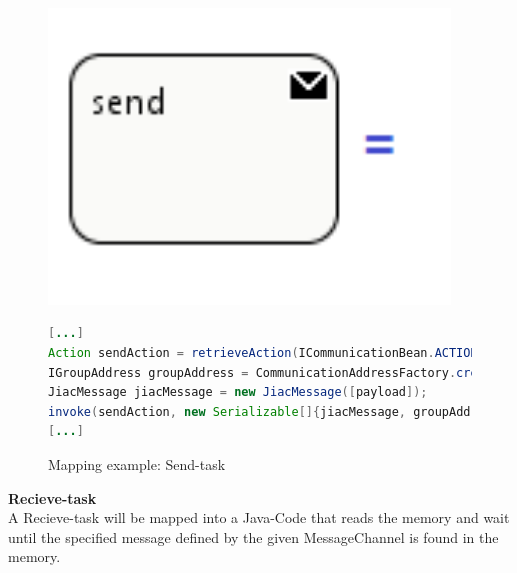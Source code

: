 \begin{figure}[h]
\begin{minipage}[c]{0.3\textwidth}
\includegraphics[width=0.95\textwidth]{images/mapping/sendTask.png}
\end{minipage}
\begin{minipage}[c]{0.7\textwidth}
\begin{lstlisting}[language=Java]
[...]
Action sendAction = retrieveAction(ICommunicationBean.ACTION_SEND);
IGroupAddress groupAddress = CommunicationAddressFactory.createGroupAddress([address]);
JiacMessage jiacMessage = new JiacMessage([payload]);
invoke(sendAction, new Serializable[]{jiacMessage, groupAddress});
[...]
\end{lstlisting}
\end{minipage}
\caption{Mapping example: Send-task}%
\label{fig:send_task}%
\end{figure}


\textbf{Recieve-task}\\
A Recieve-task will be mapped into a Java-Code that reads the memory and wait until the specified message defined by the given MessageChannel is found in the memory. \\

